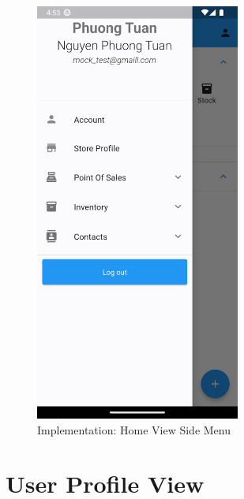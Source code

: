 \documentclass[../thesis.tex]{subfiles}
\begin{document}
\begin{figure}[H]
    \centering
    \includegraphics[width=0.60\textwidth]{images/HomeScreen_Sidebar.png}
    \caption{Implementation: Home View Side Menu}
    \label{fig:HomeScreen_Sidebar}
\end{figure}

\section{User Profile View}
\end{document}
